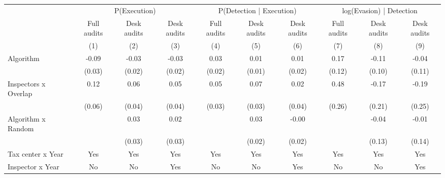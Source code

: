 \begin{tabular}{lccc|ccc|ccc} \toprule
\multicolumn{1}{l}{} & \multicolumn{3}{c}{P(Execution)} & \multicolumn{3}{c}{P(Detection | Execution)} & \multicolumn{3}{c}{log(Evasion) | Detection} \\\cmidrule(lr){2-4}\cmidrule(lr){5-7}\cmidrule(lr){8-10} \multicolumn{1}{l}{} & Full audits & Desk audits & Desk audits & Full audits & Desk audits & Desk audits & Full audits & Desk audits & Desk audits \\ \multicolumn{1}{l}{} & (1) & (2) & (3) & (4) & (5) & (6) & (7) & (8) & (9) \\ \midrule
Algorithm   &       -0.09\sym{***}&       -0.03\sym{*}  &       -0.03\sym{*}  &        0.03\sym{*}  &        0.01         &        0.01         &        0.17         &       -0.11         &       -0.04         \\
            &      (0.03)         &      (0.02)         &      (0.02)         &      (0.02)         &      (0.01)         &      (0.02)         &      (0.12)         &      (0.10)         &      (0.11)         \\
\addlinespace
Inspectors x Overlap&        0.12\sym{*}  &        0.06\sym{*}  &        0.05         &        0.05         &        0.07\sym{*}  &        0.02         &        0.48\sym{*}  &       -0.17         &       -0.19         \\
            &      (0.06)         &      (0.04)         &      (0.04)         &      (0.03)         &      (0.03)         &      (0.04)         &      (0.26)         &      (0.21)         &      (0.25)         \\
\addlinespace
Algorithm x Random&                     &        0.03         &        0.02         &                     &        0.03         &       -0.00         &                     &       -0.04         &       -0.01         \\
            &                     &      (0.03)         &      (0.03)         &                     &      (0.02)         &      (0.02)         &                     &      (0.13)         &      (0.14)         \\
\midrule
Tax center x Year&         Yes         &         Yes         &         Yes         &         Yes         &         Yes         &         Yes         &         Yes         &         Yes         &         Yes         \\
Inspector x Year&          No         &          No         &         Yes         &          No         &          No         &         Yes         &          No         &          No         &         Yes         \\

\end{tabular}
